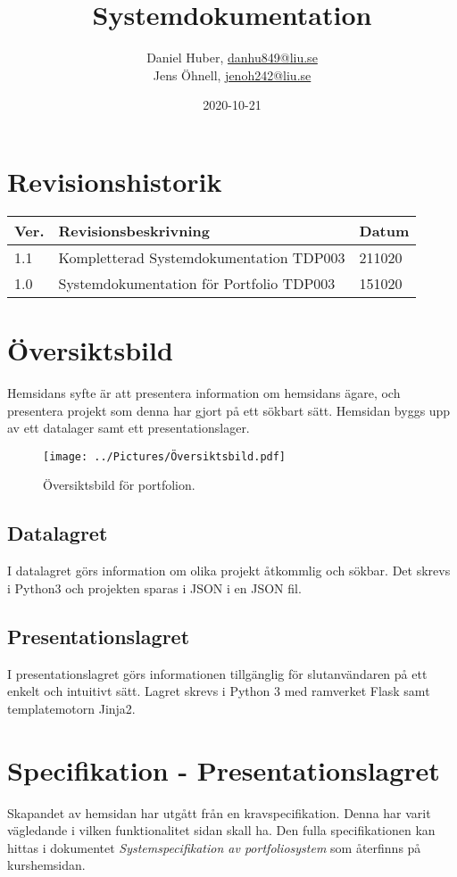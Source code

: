 \documentclass{TDP003mall}
\author{Daniel Huber, \url{danhu849@liu.se}\\
  Jens Öhnell, \url{jenoh242@liu.se}}
\title{Systemdokumentation}
\date{2020-10-21}
\begin{document}
\projectpage
\section{Revisionshistorik}
\begin{table}[!h]
\begin{tabularx}{\linewidth}{|l|X|l|}
\hline
Ver. & Revisionsbeskrivning & Datum \\\hline
1.1 & Kompletterad Systemdokumentation TDP003 & 211020 \\\hline
1.0 & Systemdokumentation för Portfolio TDP003 & 151020 \\\hline
\end{tabularx}
\end{table}


\section{Översiktsbild}
Hemsidans syfte är att presentera information om hemsidans ägare, och presentera projekt som denna har gjort på ett sökbart sätt. Hemsidan byggs upp av ett datalager samt ett presentationslager.
\begin{figure}[h]
  \centerline{\texttt{[image: ../Pictures/Översiktsbild.pdf]}}
  \caption{Översiktsbild för portfolion. \label{fig:1}}
\end{figure}

\subsection{Datalagret}
I datalagret görs information om olika projekt åtkommlig och sökbar. Det skrevs i Python3 och projekten sparas i JSON i en JSON fil.

\subsection{Presentationslagret}
I presentationslagret görs informationen tillgänglig för slutanvändaren på ett enkelt och intuitivt sätt. Lagret skrevs i Python 3 med ramverket Flask samt templatemotorn Jinja2.

\section{Specifikation - Presentationslagret}
Skapandet av hemsidan har utgått från en kravspecifikation. Denna har varit vägledande i vilken funktionalitet sidan skall ha. Den fulla specifikationen kan hittas i dokumentet \textit{Systemspecifikation av portfoliosystem} som återfinns på kurshemsidan.
\end{document}
